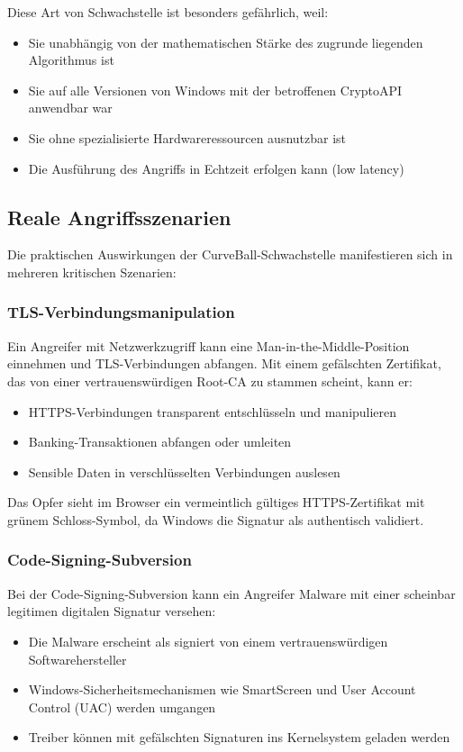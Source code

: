 \documentclass{article}
\begin{document}
Diese Art von Schwachstelle ist besonders gefährlich, weil:
\begin{itemize}
  \item Sie unabhängig von der mathematischen Stärke des zugrunde liegenden Algorithmus ist
  \item Sie auf alle Versionen von Windows mit der betroffenen CryptoAPI anwendbar war
  \item Sie ohne spezialisierte Hardwareressourcen ausnutzbar ist
  \item Die Ausführung des Angriffs in Echtzeit erfolgen kann (low latency)
\end{itemize}

\subsection{Reale Angriffsszenarien}

Die praktischen Auswirkungen der CurveBall-Schwachstelle manifestieren sich in mehreren kritischen Szenarien:

\subsubsection{TLS-Verbindungsmanipulation}
Ein Angreifer mit Netzwerkzugriff kann eine Man-in-the-Middle-Position einnehmen und TLS-Verbindungen abfangen. Mit einem gefälschten Zertifikat, das von einer vertrauenswürdigen Root-CA zu stammen scheint, kann er:

\begin{itemize}
  \item HTTPS-Verbindungen transparent entschlüsseln und manipulieren
  \item Banking-Transaktionen abfangen oder umleiten
  \item Sensible Daten in verschlüsselten Verbindungen auslesen
\end{itemize}

Das Opfer sieht im Browser ein vermeintlich gültiges HTTPS-Zertifikat mit grünem Schloss-Symbol, da Windows die Signatur als authentisch validiert.

\subsubsection{Code-Signing-Subversion}
Bei der Code-Signing-Subversion kann ein Angreifer Malware mit einer scheinbar legitimen digitalen Signatur versehen:

\begin{itemize}
  \item Die Malware erscheint als signiert von einem vertrauenswürdigen Softwarehersteller
  \item Windows-Sicherheitsmechanismen wie SmartScreen und User Account Control (UAC) werden umgangen
  \item Treiber können mit gefälschten Signaturen ins Kernelsystem geladen werden
\end{itemize}
\end{document}
